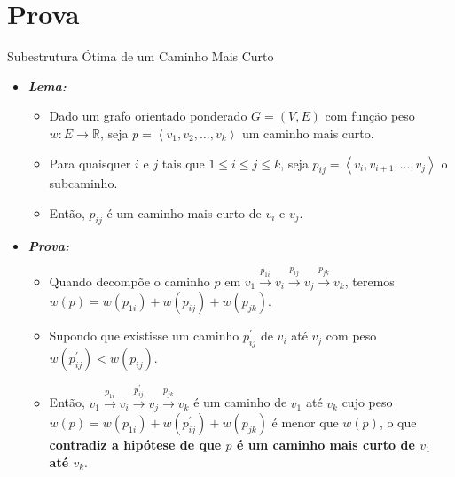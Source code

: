\documentclass[aspectratio=169]{beamer}
\begin{document}
\section{Prova}
	\begin{frame}{Subestrutura Ótima de um Caminho Mais Curto \cite{cormen2002algoritmos}}
		\begin{itemize}
			\item \textit{\textbf{Lema:}}
			\begin{itemize}
				\item Dado um grafo orientado ponderado $G = (V, E)$ com função peso $w : E \rightarrow \mathbb{R}$, seja $p = \left \langle v_{1}, v_{2}, \ldots, v_{k}\right \rangle$ um caminho mais curto.
				
				\item Para quaisquer $i$ e $j$ tais que $1 \le i \le j \le k$, seja $p_{ij}= \left \langle v_{i}, v_{i + 1}, \ldots, v_{j}\right \rangle$ o subcaminho. 
				
				\item Então, $p_{ij}$ é um caminho mais curto de $v_i$ e $v_j$.
			\end{itemize}
			
			\bigskip
			\pause
			
			\item \textit{\textbf{Prova:}}
			\begin{itemize}
				\item  Quando decompõe o caminho $p$ em $v_1 \xrightarrow{p_{1i}} v_i \xrightarrow{p_{ij}} v_j \xrightarrow{p_{jk}} v_k$, teremos $w(p) = w(p_{1i}) + w(p_{ij}) + w(p_{jk})$. 
				
				\item Supondo que existisse um caminho $p^\prime_{ij}$ de $v_i$ até $v_j$ com peso $w(p^\prime_{ij}) < w(p_{ij})$. 
				
				\item Então, $v_1 \xrightarrow{p_{1i}} v_i \xrightarrow{p^\prime_{ij}} v_j \xrightarrow{p_{jk}} v_k$ é um caminho de $v_1$ até $v_k$ cujo peso $w(p) = w(p_{1i}) + w(p^\prime_{ij}) + w(p_{jk})$ é menor que $w(p)$, o que \textbf{contradiz a hipótese de que $p$ é um caminho mais curto de $v_1$ até $v_k$}.
			\end{itemize}
		\end{itemize}
	\end{frame}
	
\end{document}
